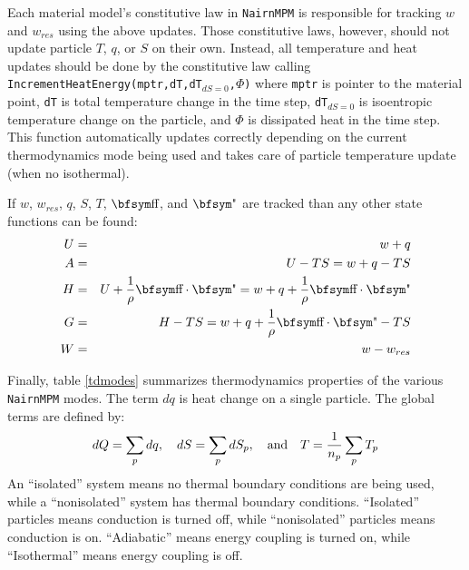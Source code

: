 \documentclass[11pt]{book}
\def\st{{\hbox{\bfsym\char'033}}}
\def\et{{\hbox{\bfsym\char'042}}}
\begin{document}
Each material model's constitutive law in {\tt NairnMPM} is responsible for tracking $w$ and $w_{res}$ using the above updates. Those constitutive laws, however, should not update particle $T$, $q$, or $S$ on their own. Instead, all temperature and heat updates should be done by the constitutive law calling {\tt IncrementHeatEnergy(mptr,dT,dT$_{dS=0}$,$\Phi$)} where {\tt mptr} is pointer to the material point, {\tt dT} is total temperature change in the time step, {\tt dT$_{dS=0}$} is isoentropic temperature change on the particle, and $\Phi$ is dissipated heat in the time step. This function automatically updates correctly depending on the current thermodynamics mode being used and takes care of particle temperature update (when no isothermal).

If $w$, $w_{res}$, $q$, $S$, $T$, $\st$, and $\et$ are tracked than any other state functions can be found:
\begin{eqnarray}
           U & = & w+q \\
           A & = & U - TS = w+q-TS \\
           H & = & U + {1\over\rho} \st\cdot\et = w+q+ {1\over\rho} \st\cdot\et \\
           G & = & H-TS = w+q+ {1\over\rho} \st\cdot\et - TS \\
           W & = & w - w_{res}
\end{eqnarray}

Finally, table \ref{tdmodes} summarizes thermodynamics properties of the various {\tt NairnMPM} modes. The term $dq$ is heat change on a single particle. The global terms are defined by:
\begin{equation}
     dQ = \sum_p dq, \quad dS = \sum_p dS_p, \quad{\rm and}\quad T = {1\over n_p}\sum_p T_p
\end{equation}
An ``isolated'' system means no thermal boundary conditions are being used, while a ``nonisolated'' system has thermal boundary conditions. ``Isolated'' particles means conduction is turned off, while ``nonisolated'' particles means conduction is on. ``Adiabatic'' means energy coupling is turned on, while ``Isothermal'' means energy coupling is off.
\end{document}
